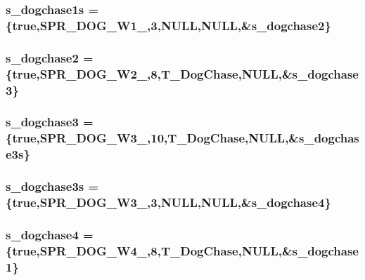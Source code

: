 \label{WL__ACT2_8C_a50a4f7d61d6b2fe4fb9a477b1ac624e7}
\hypertarget{WL__ACT2_8C_ac1e945faeeb8ce63796f06ad7126503a}{
\subsubsection[{s\_\-dogchase1s}]{ {\bf s\_\-dogchase1s} = \{true,SPR\_\-DOG\_\-W1\_,3,NULL,NULL,\&{\bf s\_\-dogchase2}\}}}
\label{WL__ACT2_8C_ac1e945faeeb8ce63796f06ad7126503a}
\hypertarget{WL__ACT2_8C_ae36e705e7161bfbabc90b7447d82e999}{
\subsubsection[{s\_\-dogchase2}]{ {\bf s\_\-dogchase2} = \{true,SPR\_\-DOG\_\-W2\_,8,T\_\-DogChase,NULL,\&{\bf s\_\-dogchase3}\}}}
\label{WL__ACT2_8C_ae36e705e7161bfbabc90b7447d82e999}
\hypertarget{WL__ACT2_8C_ae9e5cb1977ba76a76de4a6ebee8c385e}{
\subsubsection[{s\_\-dogchase3}]{ {\bf s\_\-dogchase3} = \{true,SPR\_\-DOG\_\-W3\_,10,T\_\-DogChase,NULL,\&{\bf s\_\-dogchase3s}\}}}
\label{WL__ACT2_8C_ae9e5cb1977ba76a76de4a6ebee8c385e}
\hypertarget{WL__ACT2_8C_a1d7285618b28c1fc7a6bebed630f9907}{
\subsubsection[{s\_\-dogchase3s}]{ {\bf s\_\-dogchase3s} = \{true,SPR\_\-DOG\_\-W3\_,3,NULL,NULL,\&{\bf s\_\-dogchase4}\}}}
\label{WL__ACT2_8C_a1d7285618b28c1fc7a6bebed630f9907}
\hypertarget{WL__ACT2_8C_a2c20549f02ea25ec68a58330a4ded3ce}{
\subsubsection[{s\_\-dogchase4}]{ {\bf s\_\-dogchase4} = \{true,SPR\_\-DOG\_\-W4\_,8,T\_\-DogChase,NULL,\&{\bf s\_\-dogchase1}\}}}

